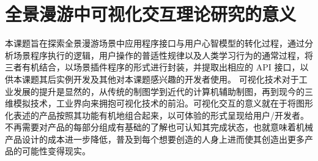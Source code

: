 \section{全景漫游中可视化交互理论研究的意义}
本课题旨在探索全景漫游场景中应用程序接口与用户心智模型的转化过程，通过分析场景程序执行的逻辑，用户操作的普适性规律以及人类学习行为的通常过程，将三者有机结合，以场景插件程序的形式进行封装，并提取出相应的 API 接口，以供本课题其后实例开发及其他对本课题感兴趣的开发者使用。
可视化技术对于工业发展的提升是显然的，从传统的制图学到近代的计算机辅助制图，再到现今的三维模拟技术，工业界向来拥抱可视化技术的前沿。可视化交互的意义就在于将图形化表述的产品按照其功能有机地组合起来，以可体验的形式呈现给用户/开发者。不再需要对产品的每部分组成有基础的了解也可认知其完成状态，也就意味着机械产品设计的成本进一步降低，普及到每个想要创造的人身上进而使其创造出更多产品的可能性变得现实。
